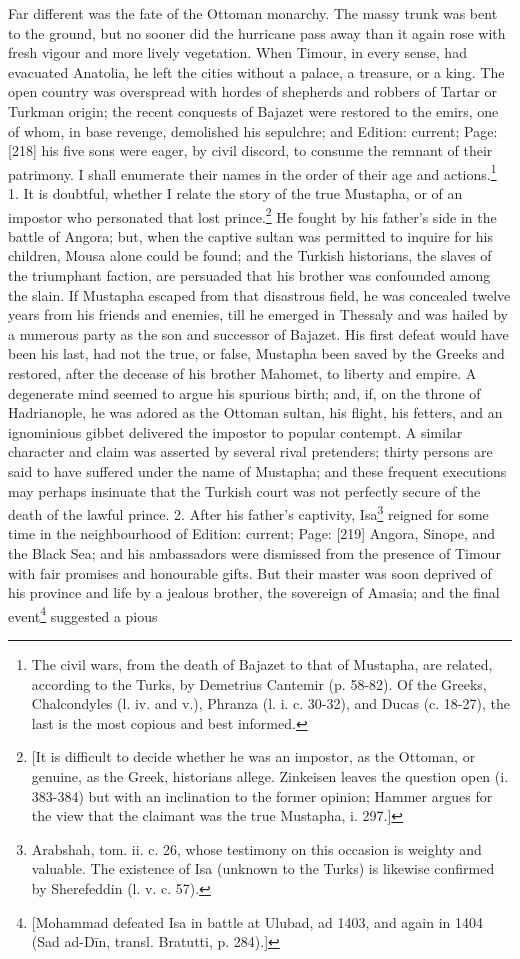 Far different was the fate of the Ottoman monarchy. The massy trunk was bent to the ground, but no sooner did the hurricane pass away than it again rose with fresh vigour and more lively vegetation. When Timour, in every sense, had evacuated Anatolia, he left the cities without a palace, a treasure, or a king. The open country was overspread with hordes of shepherds and robbers of Tartar or Turkman origin; the recent conquests of Bajazet were restored to the emirs, one of whom, in base revenge, demolished his sepulchre; and Edition: current; Page: [218] his five sons were eager, by civil discord, to consume the remnant of their patrimony. I shall enumerate their names in the order of their age and actions.\footnote{The civil wars, from the death of Bajazet to that of Mustapha, are related, according to the Turks, by Demetrius Cantemir (p. 58-82). Of the Greeks, Chalcondyles (l. iv. and v.), Phranza (l. i. c. 30-32), and Ducas (c. 18-27), the last is the most copious and best informed.} 1. It is doubtful, whether I relate the story of the true Mustapha, or of an impostor who personated that lost prince.\footnote{[It is difficult to decide whether he was an impostor, as the Ottoman, or genuine, as the Greek, historians allege. Zinkeisen leaves the question open (i. 383-384) but with an inclination to the former opinion; Hammer argues for the view that the claimant was the true Mustapha, i. 297.]} He fought by his father\texthebrew{}’s side in the battle of Angora; but, when the captive sultan was permitted to inquire for his children, Mousa alone could be found; and the Turkish historians, the slaves of the triumphant faction, are persuaded that his brother was confounded among the slain. If Mustapha escaped from that disastrous field, he was concealed twelve years from his friends and enemies, till he emerged in Thessaly and was hailed by a numerous party as the son and successor of Bajazet. His first defeat would have been his last, had not the true, or false, Mustapha been saved by the Greeks and restored, after the decease of his brother Mahomet, to liberty and empire. A degenerate mind seemed to argue his spurious birth; and, if, on the throne of Hadrianople, he was adored as the Ottoman sultan, his flight, his fetters, and an ignominious gibbet delivered the impostor to popular contempt. A similar character and claim was asserted by several rival pretenders; thirty persons are said to have suffered under the name of Mustapha; and these frequent executions may perhaps insinuate that the Turkish court was not perfectly secure of the death of the lawful prince. 2. After his father\texthebrew{}’s captivity, Isa\footnote{Arabshah, tom. ii. c. 26, whose testimony on this occasion is weighty and valuable. The existence of Isa (unknown to the Turks) is likewise confirmed by Sherefeddin (l. v. c. 57).} reigned for some time in the neighbourhood of Edition: current; Page: [219] Angora, Sinope, and the Black Sea; and his ambassadors were dismissed from the presence of Timour with fair promises and honourable gifts. But their master was soon deprived of his province and life by a jealous brother, the sovereign of Amasia; and the final event\footnote{[Mohammad defeated Isa in battle at Ulubad, ad 1403, and again in 1404 (Sad ad-Dīn, transl. Bratutti, p. 284).]} suggested a pious 